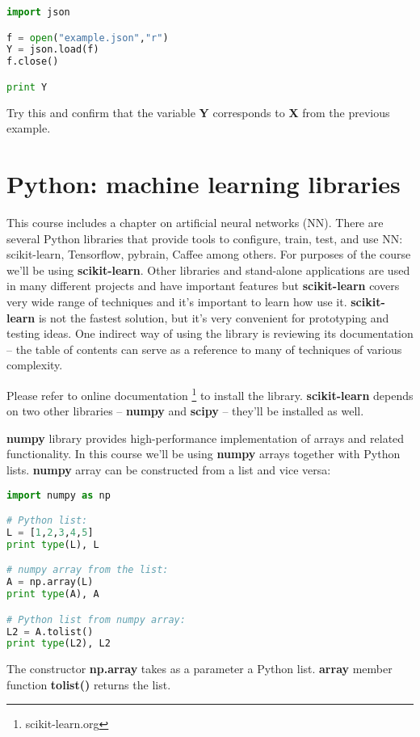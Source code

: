 \begin{lstlisting}[language=Python,style=codelst2,caption={Python: load from JSON file}]
import json

f = open("example.json","r")
Y = json.load(f)
f.close()

print Y
\end{lstlisting}
Try this and confirm that the variable \textbf{Y} corresponds to
\textbf{X} from the previous example.

\section{Python: machine learning libraries}

This course includes a chapter on artificial neural networks (NN).
There are several Python libraries that provide tools to configure,
train, test, and use NN: scikit-learn, Tensorflow, pybrain, Caffee
among others.
For purposes of the course we'll be using \textbf{scikit-learn}. Other
libraries and stand-alone applications are used in many different
projects and have important features but \textbf{scikit-learn} covers
very wide range of techniques and it's important to learn how
use it. \textbf{scikit-learn} is not the fastest solution, but it's
very convenient for prototyping and testing ideas. One indirect
way of using the library is reviewing its documentation -- the
table of contents can serve as a reference to many of techniques
of various complexity.

Please refer to online documentation \footnote{scikit-learn.org}
to install the library. \textbf{scikit-learn} depends on two other
libraries -- \textbf{numpy} and \textbf{scipy} -- 
they'll be installed as well.

\textbf{numpy} library provides high-performance implementation
of arrays and related functionality. In this course we'll be using
\textbf{numpy} arrays together with Python lists. \textbf{numpy}
array can be constructed from a list and vice versa:

\begin{lstlisting}[language=Python,style=codelst2,caption={Python: lists and \textbf{numpy} arrays}]
import numpy as np

# Python list:
L = [1,2,3,4,5]
print type(L), L

# numpy array from the list:
A = np.array(L)
print type(A), A

# Python list from numpy array:
L2 = A.tolist()
print type(L2), L2
\end{lstlisting}
The constructor \textbf{np.array} takes as a parameter a Python list.
\textbf{array} member function \textbf{tolist()} returns the list.

